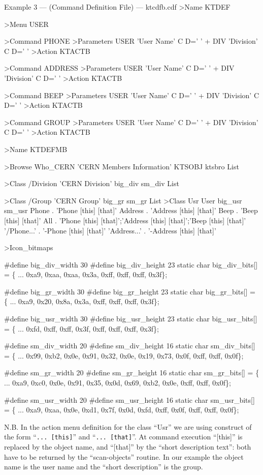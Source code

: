 \begin{XMPt} {Example 3 --- \CDF{} (Command Definition File) ---
ktcdfb.cdf}
>Name KTDEF

>Menu USER

>Command PHONE
>Parameters
USER   'User Name' C D=' '
+
DIV    'Division' C D=' '
>Action KTACTB

>Command ADDRESS
>Parameters
USER   'User Name' C D=' '
+
DIV    'Division' C D=' '
>Action KTACTB

>Command BEEP
>Parameters
USER   'User Name' C D=' '
+
DIV    'Division' C D=' '
>Action KTACTB

>Command GROUP
>Parameters
USER   'User Name' C D=' '
+
DIV    'Division' C D=' '
>Action KTACTB

>Name KTDEFMB

>Browse Who_CERN 'CERN Members Information' KTSOBJ ktsbro%
 List

>Class /Division 'CERN Division' big_div sm_div
 List

>Class /Group 'CERN Group' big_gr sm_gr
 List
>Class Usr User big_usr sm_usr
 Phone       .  'Phone [this] [that]'
 Address     .  'Address [this] [that]'
 Beep        .  'Beep [this] [that]'
 All         .  'Phone [this] [that]';'Address [this] [that]';'Beep [this] [that]'
'/Phone...'  .  '-Phone [this] [that]'
'Address...' .  '-Address [this] [that]'

>Icon_bitmaps

#define big_div_width 30
#define big_div_height 23
static char big_div_bits[] = \{
   ...
   0xa9, 0xaa, 0xaa, 0x3a, 0xff, 0xff, 0xff, 0x3f\};

#define big_gr_width 30
#define big_gr_height 23
static char big_gr_bits[] = \{
   ...
   0xa9, 0x20, 0x8a, 0x3a, 0xff, 0xff, 0xff, 0x3f\};

#define big_usr_width 30
#define big_usr_height 23
static char big_usr_bits[] = \{
   ...
   0xfd, 0xff, 0xff, 0x3f, 0xff, 0xff, 0xff, 0x3f\};

#define sm_div_width 20
#define sm_div_height 16
static char sm_div_bits[] = \{
   ...
   0x99, 0xb2, 0x0e, 0x91, 0x32, 0x0e, 0x19, 0x73, 0x0f, 0xff, 0xff, 0x0f\};

#define sm_gr_width 20
#define sm_gr_height 16
static char sm_gr_bits[] = \{
   ...
   0xa9, 0xc0, 0x0e, 0x91, 0x35, 0x0d, 0x69, 0xb2, 0x0e, 0xff, 0xff, 0x0f\};

#define sm_usr_width 20
#define sm_usr_height 16
static char sm_usr_bits[] = \{
   ...
   0xa9, 0xaa, 0x0e, 0xd1, 0x7f, 0x0d, 0xfd, 0xff, 0x0f, 0xff, 0xff, 0x0f\};
\end{XMPt}
N.B. In the action menu definition for the class ``Usr'' we are using
construct of the form  ``{\tt ... [this]}'' and ``{\tt ... [that]}''. At
command execution ``[this]'' is replaced by the object name, and
``[that]'' by the ``short description text'': both have to be returned by 
the ``scan-objects'' routine. In our example the object name is the
user name and the ``short description'' is the group.

